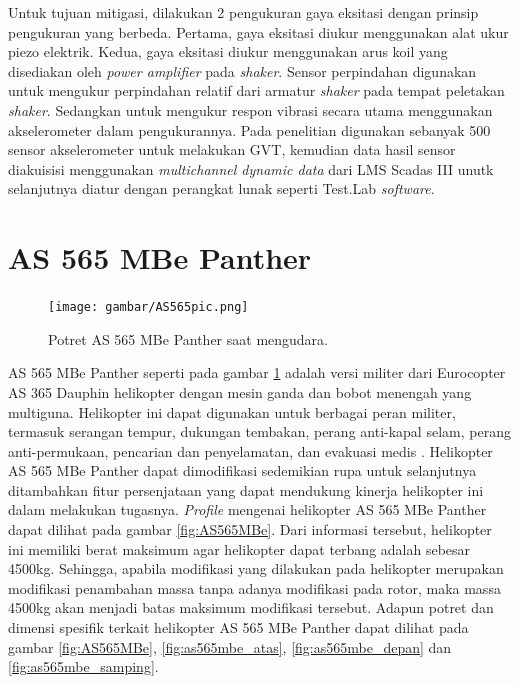 Untuk tujuan mitigasi, dilakukan 2 pengukuran gaya eksitasi dengan prinsip pengukuran yang berbeda. Pertama, gaya eksitasi diukur menggunakan alat ukur piezo elektrik. Kedua, gaya eksitasi diukur menggunakan arus koil yang disediakan oleh \textit{power amplifier} pada \textit{shaker}. Sensor perpindahan digunakan untuk mengukur perpindahan relatif dari armatur \textit{shaker} pada tempat peletakan \textit{shaker}. Sedangkan untuk mengukur respon vibrasi secara utama menggunakan akselerometer dalam pengukurannya. Pada penelitian \cite{lubrina:hal-01059708} digunakan sebanyak 500 sensor akselerometer untuk melakukan GVT, kemudian data hasil sensor diakuisisi menggunakan \textit{multichannel dynamic data} dari LMS Scadas III unutk selanjutnya diatur dengan perangkat lunak seperti Test.Lab \textit{software}.


\section{AS 565 MBe Panther}
\label{sec:AS565MBe}

\begin{figure}[H]
	\centering
	\texttt{[image: gambar/AS565pic.png]}
	\caption{Potret AS 565 MBe Panther saat mengudara.}
	\label{fig:AS565pic}
\end{figure}

AS 565 MBe Panther seperti pada gambar \ref{fig:AS565pic} adalah versi militer dari Eurocopter AS 365 Dauphin helikopter dengan mesin ganda dan bobot menengah yang multiguna. Helikopter ini dapat digunakan untuk berbagai peran militer, termasuk serangan tempur, dukungan tembakan, perang anti-kapal selam, perang anti-permukaan, pencarian dan penyelamatan, dan evakuasi medis \cite{AS565MBe}. Helikopter AS 565 MBe Panther dapat dimodifikasi sedemikian rupa untuk selanjutnya ditambahkan fitur persenjataan yang dapat mendukung kinerja helikopter ini dalam melakukan tugasnya. \textit{Profile} mengenai helikopter AS 565 MBe Panther dapat dilihat pada gambar \ref{fig:AS565MBe}. Dari informasi tersebut, helikopter ini memiliki berat maksimum agar helikopter dapat terbang adalah sebesar 4500kg. Sehingga, apabila modifikasi yang dilakukan pada helikopter merupakan modifikasi penambahan massa tanpa adanya modifikasi pada rotor, maka massa 4500kg akan menjadi batas maksimum modifikasi tersebut. Adapun potret dan dimensi spesifik terkait helikopter AS 565 MBe Panther dapat dilihat pada gambar \ref{fig:AS565MBe}, \ref{fig:as565mbe_atas}, \ref{fig:as565mbe_depan} dan \ref{fig:as565mbe_samping}.

